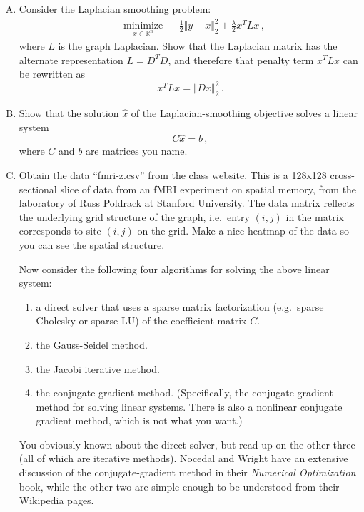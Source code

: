 \documentclass{mynotes}
\newcommand{\R}{\mathbb{R}}
\begin{document}
\begin{enumerate}[(A)]
\item Consider the Laplacian smoothing problem:
\begin{equation}
\begin{aligned}
& \underset{x \in \R^n}{\text{minimize}}
& & 
\frac{1}{2} \Vert y - x \Vert_2^2  + \frac{\lambda}{2} x^T L x \, ,
\end{aligned}
\end{equation}
where $L$ is the graph Laplacian.  Show that the Laplacian matrix has the alternate representation $L = D^T D$, and therefore that penalty term $x^T L x$ can be rewritten as
$$
x^T L x = \Vert D x \Vert_2^2 \, .
$$

\item Show that the solution $\hat{x}$ of the Laplacian-smoothing objective solves a linear system
$$
C \hat{x} = b \, ,
$$
where $C$ and $b$ are matrices you name.

\item Obtain the data ``fmri-z.csv'' from the class website.  This is a 128x128 cross-sectional slice of data from an fMRI experiment on spatial memory, from the laboratory of Russ Poldrack at Stanford University.  The data matrix reflects the underlying grid structure of the graph, i.e.~entry $(i,j)$ in the matrix corresponds to site $(i,j)$ on the grid.  Make a nice heatmap of the data so you can see the spatial structure.

Now consider the following four algorithms for solving the above linear system:
\begin{enumerate}[1.]
\item a direct solver that uses a sparse matrix factorization (e.g.~sparse Cholesky or sparse LU) of the coefficient matrix $C$.
\item the Gauss-Seidel method.
\item the Jacobi iterative method.
\item the conjugate gradient method.  (Specifically, the conjugate gradient method for solving linear systems.  There is also a nonlinear conjugate gradient method, which is not what you want.)
\end{enumerate}

You obviously known about the direct solver, but read up on the other three (all of which are iterative methods).  Nocedal and Wright have an extensive discussion of the conjugate-gradient method in their \textit{Numerical Optimization} book, while the other two are simple enough to be understood from their Wikipedia pages.


\end{enumerate}
\end{document}
